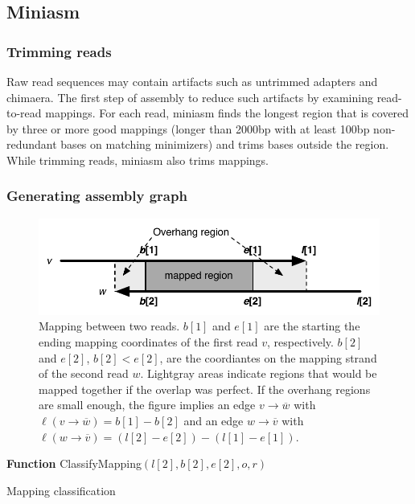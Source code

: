 \documentclass{bioinfo}
\begin{document}
\begin{methods}
\subsection{Miniasm}

\subsubsection{Trimming reads}

Raw read sequences may contain artifacts such as untrimmed adapters and
chimaera. The first step of assembly to reduce such artifacts by examining
read-to-read mappings. For each read, miniasm finds the longest region that is
covered by three or more good mappings (longer than 2000bp with at least 100bp
non-redundant bases on matching minimizers) and trims bases outside the region.
While trimming reads, miniasm also trims mappings.

\subsubsection{Generating assembly graph}

\begin{figure}[tb]
\centering
\includegraphics[width=.45\textwidth]{overhang}
\caption{Mapping between two reads. $b[1]$ and $e[1]$ are the starting the
ending mapping coordinates of the first read $v$, respectively. $b[2]$ and
$e[2]$, $b[2]<e[2]$, are the coordiantes on the mapping strand of the second
read $w$. Lightgray areas indicate regions that would be mapped together if the
overlap was perfect. If the overhang regions are small enough, the figure
implies an edge $v\to\overline{w}$ with $\ell(v\to\overline{w})=b[1]-b[2]$ and
an edge $w\to\overline{v}$ with
$\ell(w\to\overline{v})=(l[2]-e[2])-(l[1]-e[1])$.}\label{fig:overhang}
\end{figure}

\begin{algorithm}[bt]
\DontPrintSemicolon
\footnotesize
{}
\BlankLine
\textbf{Function} {\sc ClassifyMapping}$(l[2], b[2], e[2], o, r)$
\caption{Mapping classification}
\end{algorithm}


\end{methods}
\end{document}
